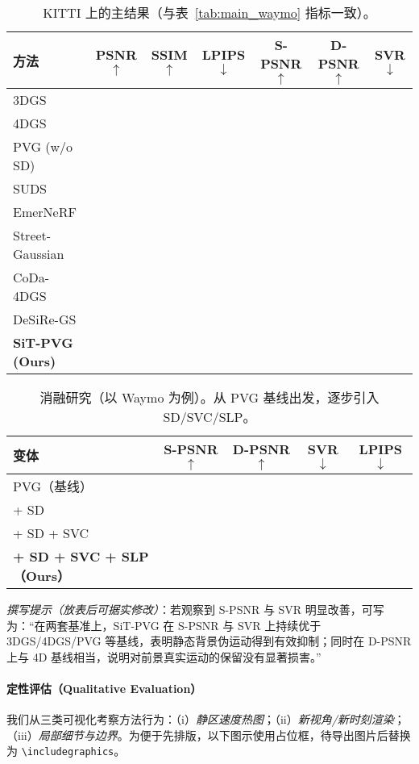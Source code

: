 \documentclass[10pt,conference]{IEEEtran} %
\begin{document}
\begin{table*}[t]
\centering
\caption{KITTI 上的主结果（与表~\ref{tab:main_waymo} 指标一致）。}
\label{tab:main_kitti}
\renewcommand{\arraystretch}{1.12}
\begin{tabular}{lcccccc}
\toprule
方法 & PSNR$\uparrow$ & SSIM$\uparrow$ & LPIPS$\downarrow$ & S\mbox{-}PSNR$\uparrow$ & D\mbox{-}PSNR$\uparrow$ & SVR$\downarrow$ \\
\midrule
3DGS &  &  &  &  &  &  \\
4DGS &  &  &  &  &  &  \\
PVG (w/o SD) &  &  &  &  &  &  \\
SUDS &  &  &  &  &  &  \\
EmerNeRF &  &  &  &  &  &  \\
Street\mbox{-}Gaussian &  &  &  &  &  &  \\
CoDa\mbox{-}4DGS &  &  &  &  &  &  \\
DeSiRe\mbox{-}GS &  &  &  &  &  &  \\
\textbf{SiT\mbox{-}PVG (Ours)} &  &  &  &  &  &  \\
\bottomrule
\end{tabular}
\end{table*}

\begin{table}[t]
\centering
\caption{消融研究（以 Waymo 为例）。从 PVG 基线出发，逐步引入 SD/SVC/SLP。}
\label{tab:ablation}
\renewcommand{\arraystretch}{1.12}
\begin{tabular}{lcccc}
\toprule
变体 & S\mbox{-}PSNR$\uparrow$ & D\mbox{-}PSNR$\uparrow$ & SVR$\downarrow$ & LPIPS$\downarrow$ \\
\midrule
PVG（基线） &  &  &  &  \\
+ SD &  &  &  &  \\
+ SD + SVC &  &  &  &  \\
\textbf{+ SD + SVC + SLP（Ours）} &  &  &  &  \\
\bottomrule
\end{tabular}
\end{table}

\noindent
\emph{撰写提示（放表后可据实修改）}：若观察到 S-PSNR 与 SVR 明显改善，可写为：“在两套基准上，SiT\mbox{-}PVG 在 S\mbox{-}PSNR 与 SVR 上持续优于 3DGS/4DGS/PVG 等基线，表明静态背景伪运动得到有效抑制；同时在 D\mbox{-}PSNR 上与 4D 基线相当，说明对前景真实运动的保留没有显著损害。”

\paragraph{定性评估（Qualitative Evaluation）}
我们从三类可视化考察方法行为：（i）\emph{静区速度热图}；（ii）\emph{新视角/新时刻渲染}；（iii）\emph{局部细节与边界}。为便于先排版，以下图示使用占位框，待导出图片后替换为 \verb|\includegraphics|。
\end{document}
